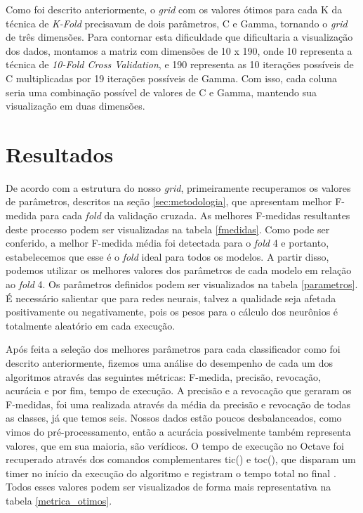 \documentclass[10pt, conference, compsocconf]{IEEEtran}
\begin{document}
Como foi descrito anteriormente, o \textit{grid} com os valores ótimos para cada K da
técnica de \textit{K-Fold} precisavam de dois parâmetros, C e Gamma, tornando o \textit{grid} de
três dimensões. Para contornar esta dificuldade que dificultaria a visualização 
dos dados, montamos a matriz com dimensões de 10 x 190, onde 10 representa a 
técnica de \textit{10-Fold Cross Validation}, e 190 representa as 10 iterações possíveis 
de C multiplicadas por 19 iterações possíveis de Gamma. Com isso, cada coluna 
seria uma combinação possível de valores de C e Gamma, mantendo sua visualização em duas dimensões.



\section{Resultados}\label{sec:resultados}
De acordo com a estrutura do nosso \textit{grid}, primeiramente recuperamos os valores 
de parâmetros, descritos na seção \ref{sec:metodologia}, que apresentam melhor 
F-medida para cada \textit{fold} da validação cruzada. As melhores F-medidas resultantes 
deste processo podem ser visualizadas na tabela \ref{fmedidas}. Como pode 
ser conferido, a melhor F-medida média foi detectada para o \textit{fold} 4 e 
portanto, estabelecemos que esse é o \textit{fold} ideal para todos os modelos. A partir 
disso, podemos utilizar os melhores valores dos parâmetros de cada modelo em 
relação ao \textit{fold} 4. Os parâmetros definidos podem ser visualizados na tabela
\ref{parametros}. É necessário salientar que para redes neurais, talvez a 
qualidade seja afetada positivamente ou negativamente, pois os pesos para o 
cálculo dos neurônios é totalmente aleatório em cada execução.

Após feita a seleção dos melhores parâmetros para cada classificador como foi 
descrito anteriormente, fizemos uma análise do desempenho de cada um dos 
algoritmos através das seguintes métricas: F-medida, precisão, revocação, 
acurácia e por fim, tempo de execução. A precisão e a revocação que geraram 
os F-medidas, foi uma realizada através da média da precisão e revocação de 
todas as classes, já que temos seis. Nossos dados estão poucos desbalanceados, 
como vimos do pré-processamento, então a acurácia possivelmente também 
representa valores, que em sua maioria, são verídicos. O tempo de execução 
no Octave foi recuperado através dos comandos complementares tic() e toc(), 
que disparam um timer no início da execução do algoritmo e registram o tempo 
total no final \cite{octave:tictoc}. Todos esses valores podem ser visualizados de forma mais 
representativa na tabela \ref{metrica_otimos}.
\end{document}
